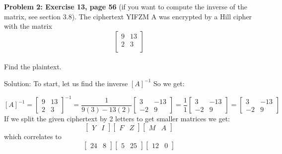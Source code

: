 \documentclass[12pt,letterpaper,final]{report}
\begin{document}
\bigskip
\noindent\textbf{Problem 2: Exercise 13, page 56} (if you want to compute the inverse of the matrix, see section 3.8). The ciphertext YIFZM A was encrypted by a Hill cipher with the matrix \[\begin{bmatrix} 9 &13 \\ 2 & 3   \\ \end{bmatrix} \] \\ Find the plaintext. 

\bigskip Solution: To start, let us find the inverse $[A]^{-1}$  
\bigskip So we get: 

\[[A]^{-1} =  \begin{bmatrix} 9 &13 \\ 2 & 3  \end{bmatrix}^{-1} = \frac{1}{9(3) - 13(2) }\begin{bmatrix} 3 &-13 \\ -2 & 9  \end{bmatrix} =  \frac{1}{1 }\begin{bmatrix} 3 &-13 \\ -2 & 9  \end{bmatrix}=\begin{bmatrix} 3 &-13 \\ -2 & 9  \end{bmatrix}\]
\bigskip If we split the given ciphertext by 2 letters to get smaller matrices we get: \[\begin{bmatrix} Y &I\end{bmatrix}\begin{bmatrix} F &Z\end{bmatrix}\begin{bmatrix} M &A\end{bmatrix}\] which correlates to \[\begin{bmatrix} 24 &8\end{bmatrix}\begin{bmatrix} 5 &25\end{bmatrix}\begin{bmatrix} 12 &0\end{bmatrix}\]
\end{document}
